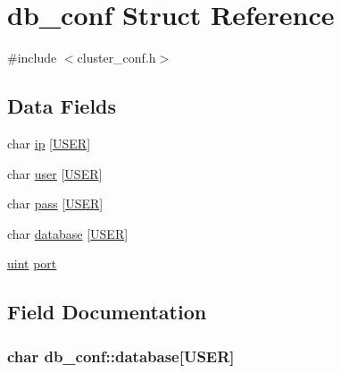 \hypertarget{structdb__conf}{}\section{db\+\_\+conf Struct Reference}
\label{structdb__conf}


{\ttfamily \#include $<$cluster\+\_\+conf.\+h$>$}

\subsection*{Data Fields}
\begin{DoxyCompactItemize}
\item 
char \hyperlink{structdb__conf_a45e0cfabfe7401704cdf48ba876ee58e}{ip} \mbox{[}\hyperlink{cluster__conf_8h_a8bfbbf31b7d3c07215440d18a064b7f4}{U\+S\+ER}\mbox{]}
\item 
char \hyperlink{structdb__conf_a765b7448118bab330a3877876e8d3654}{user} \mbox{[}\hyperlink{cluster__conf_8h_a8bfbbf31b7d3c07215440d18a064b7f4}{U\+S\+ER}\mbox{]}
\item 
char \hyperlink{structdb__conf_adf6dc17b9c5009dac8b8fed9ff92ec15}{pass} \mbox{[}\hyperlink{cluster__conf_8h_a8bfbbf31b7d3c07215440d18a064b7f4}{U\+S\+ER}\mbox{]}
\item 
char \hyperlink{structdb__conf_a69fdc16a4c604192b5e3ae1b21ae1989}{database} \mbox{[}\hyperlink{cluster__conf_8h_a8bfbbf31b7d3c07215440d18a064b7f4}{U\+S\+ER}\mbox{]}
\item 
\hyperlink{generic_8h_a91ad9478d81a7aaf2593e8d9c3d06a14}{uint} \hyperlink{structdb__conf_a491eb9a91ffa3e237d685a15d2720d5d}{port}
\end{DoxyCompactItemize}


\subsection{Field Documentation}
\subsubsection[{\texorpdfstring{database}{database}}]{\setlength{\rightskip}{0pt plus 5cm}char db\+\_\+conf\+::database\mbox{[}{\bf U\+S\+ER}\mbox{]}}\hypertarget{structdb__conf_a69fdc16a4c604192b5e3ae1b21ae1989}{}\label{structdb__conf_a69fdc16a4c604192b5e3ae1b21ae1989}
